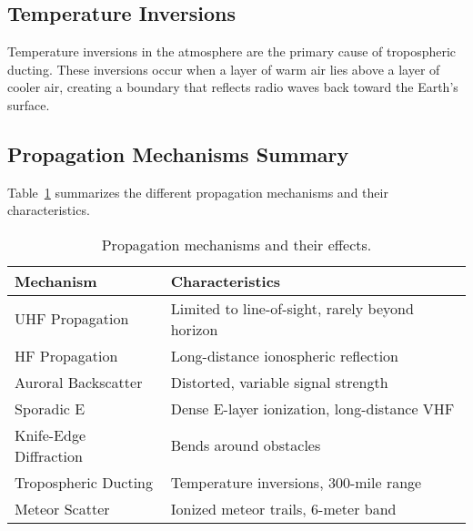 \subsection*{Temperature Inversions}
Temperature inversions in the atmosphere are the primary cause of tropospheric ducting. These inversions occur when a layer of warm air lies above a layer of cooler air, creating a boundary that reflects radio waves back toward the Earth's surface.

\subsection*{Propagation Mechanisms Summary}
Table~\ref{tab:propagation_mechanisms} summarizes the different propagation mechanisms and their characteristics.

\begin{table}[h!]
    \centering
    \begin{tabular}{|l|l|}
        \hline
        \textbf{Mechanism} & \textbf{Characteristics} \\
        \hline
        UHF Propagation & Limited to line-of-sight, rarely beyond horizon \\
        HF Propagation & Long-distance ionospheric reflection \\
        Auroral Backscatter & Distorted, variable signal strength \\
        Sporadic E & Dense E-layer ionization, long-distance VHF \\
        Knife-Edge Diffraction & Bends around obstacles \\
        Tropospheric Ducting & Temperature inversions, 300-mile range \\
        Meteor Scatter & Ionized meteor trails, 6-meter band \\
        \hline
    \end{tabular}
    \caption{Propagation mechanisms and their effects.}
    \label{tab:propagation_mechanisms}
\end{table}

